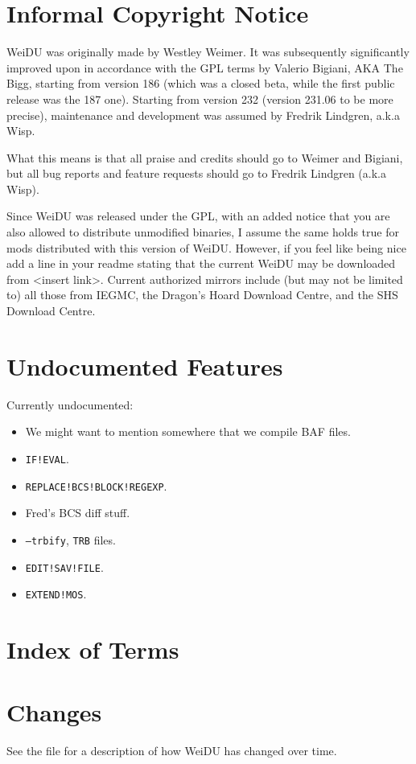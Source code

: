 \documentclass{article}
\def\t#1{{\tt #1}}
\begin{document}
\section{Informal Copyright Notice}
WeiDU was originally made by Westley Weimer. It was subsequently significantly
improved upon in accordance with the GPL terms by Valerio Bigiani, AKA The Bigg,
starting from version 186 (which was a closed beta, while the first public
release was the 187 one). Starting from version 232 (version 231.06 to be more precise),
maintenance and development was assumed by Fredrik Lindgren, a.k.a Wisp.

What this means is that all praise and credits should go to Weimer and Bigiani,
but all bug reports and feature requests should go to Fredrik Lindgren (a.k.a Wisp).

Since WeiDU was released under the GPL, with an added notice that you are also
allowed to distribute unmodified binaries, I assume the same holds true for
mods distributed with this version of WeiDU. However, if you feel like being
nice add a line in your readme stating that the current WeiDU may be downloaded
from <insert link>. Current authorized mirrors include (but may not be limited to)
all those from IEGMC, the Dragon's Hoard Download Centre, and the SHS Download Centre.

\section{Undocumented Features}

Currently undocumented:
\begin{itemize}
\item We might want to mention somewhere that we compile BAF files.
\item {\tt IF!EVAL}.
\item {\tt REPLACE!BCS!BLOCK!REGEXP}.
\item Fred's BCS diff stuff.
\item {\tt --trbify}, \t{TRB} files.
\item {\tt EDIT!SAV!FILE}.
\item {\tt EXTEND!MOS}.
\end{itemize}

\section{Index of Terms}

\printindex

\section{Changes}
See the file
for a description of how WeiDU
has changed over time.
\end{document}
